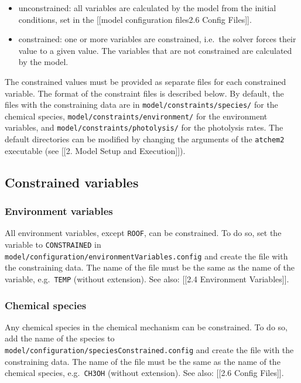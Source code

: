\begin{itemize}
\item unconstrained: all variables are calculated by the model from
  the initial conditions, set in the {[}{[}model configuration
  files\textbar{}2.6 Config Files{]}{]}.
\item constrained: one or more variables are constrained, i.e.~the
  solver forces their value to a given value. The variables that are
  not constrained are calculated by the model.
\end{itemize}

The constrained values must be provided as separate files for each
constrained variable. The format of the constraint files is described
below. By default, the files with the constraining data are in
\texttt{model/constraints/species/} for the chemical species,
\texttt{model/constraints/environment/} for the environment variables,
and \texttt{model/constraints/photolysis/} for the photolysis
rates. The default directories can be modified by changing the
arguments of the \texttt{atchem2} executable (see {[}{[}2. Model Setup
and Execution{]}{]}).

\subsection{Constrained variables} \label{subsec:constrained-variables}

\subsubsection{Environment variables} \label{environment-variables}

All environment variables, except \texttt{ROOF}, can be constrained. To
do so, set the variable to \texttt{CONSTRAINED} in
\texttt{model/configuration/environmentVariables.config} and create the
file with the constraining data. The name of the file must be the same
as the name of the variable, e.g.~\texttt{TEMP} (without extension). See
also: {[}{[}2.4 Environment Variables{]}{]}.

\subsubsection{Chemical species} \label{chemical-species}

Any chemical species in the chemical mechanism can be constrained. To
do so, add the name of the species to
\texttt{model/configuration/speciesConstrained.config} and create the
file with the constraining data. The name of the file must be the same
as the name of the chemical species, e.g.~\texttt{CH3OH} (without
extension). See also: {[}{[}2.6 Config Files{]}{]}.

